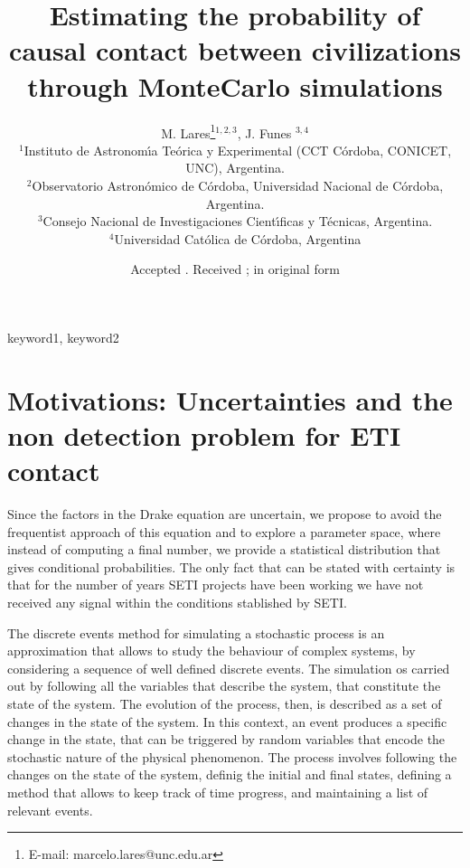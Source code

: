 \documentclass[useAMS,usenatbib]{mnras}
\title{Estimating the probability of causal contact between
civilizations through MonteCarlo simulations}
\author[M. Lares et al.]
{M. Lares\thanks{E-mail: marcelo.lares@unc.edu.ar}\footnotemark[0] $^{1,2,3}$,
J. Funes $^{3, 4}$
\\
$^{1}$Instituto de Astronom\'{\i}a Te\'orica y Experimental (CCT C\'ordoba, CONICET, UNC), Argentina.\\
$^{2}$Observatorio Astron\'omico de C\'ordoba, Universidad Nacional de C\'ordoba, Argentina.\\
$^{3}$Consejo Nacional de Investigaciones Cient\'{\i}ficas y
T\'ecnicas, Argentina.\\
$^{4}$Universidad Católica de Córdoba, Argentina
}
\begin{document}
\date{Accepted . Received ; in original form }


 \maketitle

\label{firstpage}

\begin{abstract}

\end{abstract}
%
\begin{keywords}
keyword1, keyword2
\end{keywords}
%


\section{Motivations: Uncertainties and the non detection problem for
ETI contact}


Since the factors in the Drake equation are uncertain, we propose to
avoid the frequentist approach of this equation
and to explore a parameter space, where instead of computing a final
number, we provide a statistical distribution that gives conditional
probabilities.
%
The only fact that can be stated with certainty is that for the number
of years SETI projects have been working we have not received any
signal within the conditions stablished by SETI.



The discrete events method for simulating a stochastic process is an
approximation that allows to study the behaviour of complex
systems, by considering a sequence of well defined discrete events.
%
The simulation os carried out by following all the variables that
describe the system, that constitute the state of the system.
%
The evolution of the process, then, is described as a set of changes
in the state of the system.
%
In this context, an event produces a specific change in the state,
that can be triggered by random variables that encode the stochastic
nature of the physical phenomenon.
%
The process involves following the changes on the state of the system,
definig the initial and final states, defining a method that allows to
keep track of time progress, and maintaining a list of relevant
events.
\end{document}
